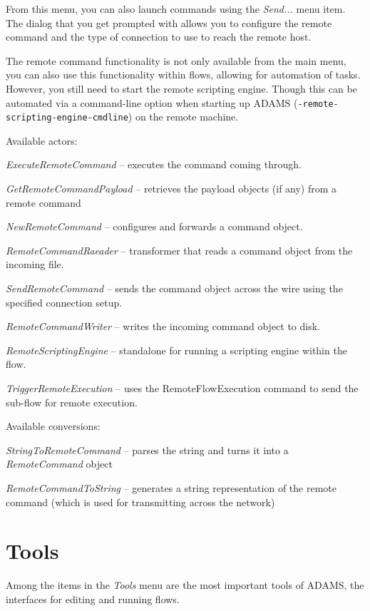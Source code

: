 From this menu, you can also launch commands using the \textit{Send...}
menu item. The dialog that you get prompted with allows you to configure
the remote command and the type of connection to use to reach the remote
host.

The remote command functionality is not only available from the main menu,
you can also use this functionality within flows, allowing for automation
of tasks. However, you still need to start the remote scripting engine. Though
this can be automated via a command-line option when starting up ADAMS
(\texttt{-remote-scripting-engine-cmdline}) on the remote machine.

Available actors:
\begin{tight_itemize}
  \item \textit{ExecuteRemoteCommand} -- executes the command coming through.
  \item \textit{GetRemoteCommandPayload} -- retrieves the payload objects (if
  any) from a remote command
  \item \textit{NewRemoteCommand} -- configures and forwards a command object.
  \item \textit{RemoteCommandRaeader} -- transformer that reads a command
  object from the incoming file.
  \item \textit{SendRemoteCommand} -- sends the command object across the wire
  using the specified connection setup.
  \item \textit{RemoteCommandWriter} -- writes the incoming command object to disk.
  \item \textit{RemoteScriptingEngine} -- standalone for running a scripting
  engine within the flow.
  \item \textit{TriggerRemoteExecution} -- uses the RemoteFlowExecution command
  to send the sub-flow for remote execution.
\end{tight_itemize}

Available conversions:
\begin{tight_itemize}
  \item \textit{StringToRemoteCommand} -- parses the string and turns it into
  a \textit{RemoteCommand} object
  \item \textit{RemoteCommandToString} -- generates a string representation of
  the remote command (which is used for transmitting across the network)
\end{tight_itemize}


\chapter{Tools}
Among the items in the \textit{Tools} menu are the most important tools of 
ADAMS, the interfaces for editing and running flows.


